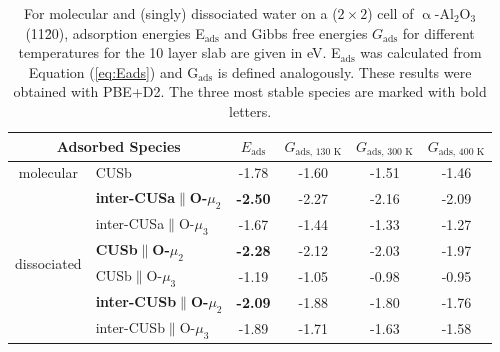 \documentclass[11pt,DIV=13,BCOR=5mm,a4paper,headinclude]{scrbook}
\begin{document}
\begin{table}[!ht]
  \centering
 \caption{For molecular and (singly) dissociated water on a ($2\times 2$) cell of $\upalpha$-Al$_2$O$_3$(11\=20), adsorption energies E$_\textrm{ads}$ and Gibbs free energies $G_\textrm{ads}$ for different temperatures for the 10 layer slab are given in eV.
E$_\textrm{ads}$ was calculated from Equation (\ref{eq:Eads}) and G$_\textrm{ads}$ is defined analogously.
These results were obtained with PBE+D2.
The three most stable species are marked with bold letters.
\vspace*{.2cm} 
  }
  \begin{tabular}{cl|cccc}
  \toprule
   \multicolumn{2}{c|}{Adsorbed Species}  & $E_\textrm{ads}$ & $G_\text{ads, 130 K}$  &  $G_\text{ads, 300 K}$  & $G_\text{ads, 400 K}$ \\\midrule
\multirow{1}{*}{molecular} & CUSb          &   -1.78  &-1.60 & -1.51  & -1.46 \\\hline
 \multirow{6}{*}{dissociated} & \textbf{inter-CUSa$\parallel$O-$\mu_2$} & \textbf{-2.50} &-2.27 & -2.16 & -2.09 \\
  & inter-CUSa$\parallel$O-$\mu_3$ & -1.67 &-1.44 &-1.33 & -1.27 \\
  & \textbf{CUSb$\parallel$O-$\mu_2$} & \textbf{-2.28} & -2.12& -2.03 &-1.97  \\
 & CUSb$\parallel$O-$\mu_3$ & -1.19 &-1.05 &-0.98 & -0.95 \\%
 & \textbf{inter-CUSb$\parallel$O-$\mu_2$} & \textbf{-2.09} &-1.88 &-1.80 & -1.76 \\
 & inter-CUSb$\parallel$O-$\mu_3$ & -1.89 &-1.71 & -1.63 & -1.58 \\\bottomrule
  \end{tabular}
  \label{tab:ads_1water}
\end{table}
\end{document}
